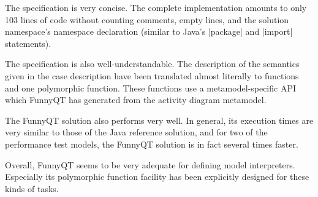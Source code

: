 \documentclass[submission]{eptcs}
\newcommand{\code}{\clojureinline}
\begin{document}
The specification is very concise.  The complete implementation amounts to only
103 lines of code without counting comments, empty lines, and the solution
namespace's namespace declaration (similar to Java's \code|package| and
\code|import| statements).

The specification is also well-understandable.  The description of the
semantics given in the case description have been translated almost literally
to functions and one polymorphic function.  These functions use a
metamodel-specific API which FunnyQT has generated from the activity diagram
metamodel.

The FunnyQT solution also performs very well.  In general, its execution times
are very similar to those of the Java reference solution, and for two of the
performance test models, the FunnyQT solution is in fact several times faster.

Overall, FunnyQT seems to be very adequate for defining model interpreters.
Especially its polymorphic function facility has been explicitly designed for
these kinds of tasks.



\end{document}

